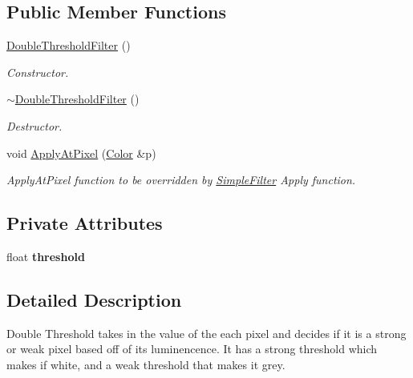 \subsection*{Public Member Functions}
\begin{DoxyCompactItemize}
\item 
\mbox{\label{classDoubleThresholdFilter_ae4c841df681b376c611e2bc07a2a0d54}} 
\hyperlink{classDoubleThresholdFilter_ae4c841df681b376c611e2bc07a2a0d54}{Double\+Threshold\+Filter} ()
\begin{DoxyCompactList}\small\item\em Constructor. \end{DoxyCompactList}\item 
\mbox{\label{classDoubleThresholdFilter_a5ebad435bdc4bfa13a936fdf243cb974}} 
\hyperlink{classDoubleThresholdFilter_a5ebad435bdc4bfa13a936fdf243cb974}{$\sim$\+Double\+Threshold\+Filter} ()
\begin{DoxyCompactList}\small\item\em Destructor. \end{DoxyCompactList}\item 
\mbox{\label{classDoubleThresholdFilter_a5d4cf6bca3324acb39859293ac6e23d3}} 
void \hyperlink{classDoubleThresholdFilter_a5d4cf6bca3324acb39859293ac6e23d3}{Apply\+At\+Pixel} (\hyperlink{classColor}{Color} \&p)
\begin{DoxyCompactList}\small\item\em Apply\+At\+Pixel function to be overridden by \hyperlink{classSimpleFilter}{Simple\+Filter} Apply function. \end{DoxyCompactList}\end{DoxyCompactItemize}
\subsection*{Private Attributes}
\begin{DoxyCompactItemize}
\item 
\mbox{\label{classDoubleThresholdFilter_a4efd024772e0a0f61ed7cd7bcdd9fabe}} 
float {\bfseries threshold}
\end{DoxyCompactItemize}


\subsection{Detailed Description}
Double Threshold takes in the value of the each pixel and decides if it is a strong or weak pixel based off of its luminencence. It has a strong threshold which makes if white, and a weak threshold that makes it grey. 

